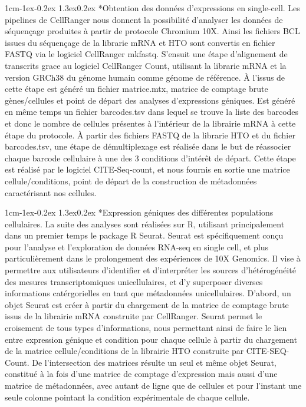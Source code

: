 \documentclass[12pt]{report}
\makeatletter
\renewcommand\subsubsection{\@startsection{subsubsection}{3}{\z@}%
	{1cm\@plus -1ex\@minus -0.2ex}%
	{1.3ex\@plus 0.2ex}%
	{\reset@font\normalsize\bf}}
\makeatother
\begin{document}
\subsubsection*{Obtention des données d'expressions en single-cell.}
Les pipelines de CellRanger nous donnent la possibilité d'analyser les données de séquençage produites à partir de protocole Chromium 10X.
Ainsi les fichiers BCL issues du séquençage de la librarie mRNA et HTO sont convertis en fichier FASTQ via le logiciel CellRanger mkfastq. 
S'ensuit une étape d'alignement de transcrits grace au logiciel CellRanger Count, utilisant la librarie mRNA et la version GRCh38 du génome humain comme génome de référence.
À l'issus de cette étape est généré un fichier matrice.mtx, matrice de comptage brute gènes/cellules et point de départ des analyses d'expressions géniques.
Est généré en même temps un fichier barcodes.tsv dans lequel se trouve la liste des barcodes et donc le nombre de cellules présentes à l'intérieur de la librairie mRNA à cette étape du protocole.
À partir des fichiers FASTQ de la librarie HTO et du fichier barcodes.tsv, une étape de démultiplexage est réalisée dans le but de réassocier chaque barcode cellulaire à une des 3 conditions d'intérêt de départ.
Cette étape est réalisé par le logiciel CITE-Seq-count, et nous fournis en sortie une matrice cellule/conditions, point de départ de la construction de métadonnées caractérisant nos cellules.


\subsubsection*{Expression géniques des différentes populations cellulaires.}
La suite des analyses sont réalisées sur R, utilisant principalement dans un premier temps le package R Seurat\cite{Seurat}. 
Seurat est spécifiquement conçu pour l'analyse et l'exploration de données RNA-seq en single cell, et plus particulièrement dans le prolongement des expériences de 10X Genomics. 
Il vise à permettre aux utilisateurs d'identifier et d'interpréter les sources d'hétérogénéité des mesures transcriptomiques unicellulaires, et d'y superposer diverses informations catérgorielles en tant que métadonnées unicellulaires.
D'abord, un objet Seurat est créer à partir du chargement de la matrice de comptage brute issus de la librairie mRNA construite par CellRanger.
Seurat permet le croisement de tous types d'informations, nous permettant ainsi de faire le lien entre expression génique et condition pour chaque cellule à partir du chargement de la matrice cellule/conditions de la librairie HTO construite par CITE-SEQ-Count.
De l'intersection des matrices résulte un seul et même objet Seurat, constitué à la fois d'une matrice de comptage d'expression 
mais aussi d'une matrice de métadonnées, avec autant de ligne que de cellules et pour l'instant une seule colonne pointant la condition expérimentale de chaque cellule.
\end{document}

